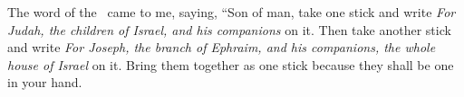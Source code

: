 
\begin{inparaenum}
   The word of the \lord\ came to me, saying,%
   ``Son of man, take one stick and write \textit{For Judah, the children of Israel, and his companions} on it. Then take another stick and write \textit{For Joseph, the branch of Ephraim, and his companions, the whole house of Israel} on it.%
   Bring them together as one stick because they shall be one in your hand.%
\end{inparaenum}
